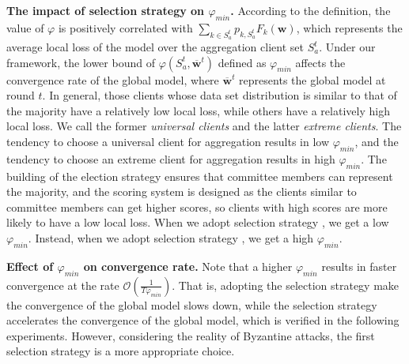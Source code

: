 \documentclass[10pt,journal,compsoc]{IEEEtran}
\newcommand{\w}{\mathbf{w}}
\begin{document}
\textbf{The impact of selection strategy on $\varphi_{min}$.} According to the definition, the value of $\varphi$ is positively correlated with $\sum_{k\in S_a^t}p_{k,S_a^t}F_k(\w)$, which represents the average local loss of the model over the aggregation client set $S_a^t$. Under our framework, the lower bound of $\varphi(S_a^{t},\overline{\w}^{t})$ defined as $\varphi_{min}$ affects the convergence rate of the global model, where $\overline{\w}^{t}$ represents the global model at round $t$. In general, those clients whose data set distribution is similar to that of the majority have a relatively low local loss, while others have a relatively high local loss. We call the former \textit{universal clients} and the latter \textit{extreme clients}. The tendency to choose a universal client for aggregation results in low $\varphi_{min}$, and the tendency to choose an extreme client for aggregation results in high $\varphi_{min}$. The building of the election strategy ensures that committee members can represent the majority, and the scoring system is designed as the clients similar to committee members can get higher scores, so clients with high scores are more likely to have a low local loss. When we adopt selection strategy \uppercase\expandafter{}, we get a low $\varphi_{min}$. Instead, when we adopt selection strategy \uppercase\expandafter{}, we get a high $\varphi_{min}$.

\textbf{Effect of $\varphi_{min}$ on convergence rate.} Note that a higher $\varphi_{min}$ results in faster convergence at the rate $\mathcal{O}(\frac{1}{T\varphi_{min}})$. That is, adopting the selection strategy \uppercase\expandafter{} make the convergence of the global model slows down, while the selection strategy \uppercase\expandafter{} accelerates the convergence of the global model, which is verified in the following experiments. However, considering the reality of Byzantine attacks, the first selection strategy is a more appropriate choice. 




\end{document}
